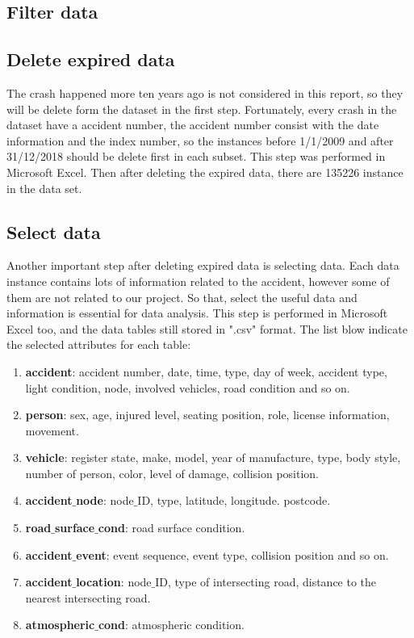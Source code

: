 \documentclass[11pt]{article}
\theoremstyle{definition}
\begin{document}
\subsection{Filter data}	
\subsection{Delete expired data}
The crash happened more ten years ago is not considered in this report, so they will be delete form the dataset in the first step. Fortunately, every crash in the dataset have a accident number, the accident number consist with the date information and the index number, so the instances before 1/1/2009 and after 31/12/2018 should be delete first in each subset.   This step was performed in Microsoft Excel. Then after deleting the expired data, there are 135226 instance in the data set.

\subsection{Select data}
Another important step after deleting expired data is selecting data. Each data instance contains lots of information related to the accident, however some of them are not related to our project. So that, select the useful data and information is essential for data analysis. This step is performed in Microsoft Excel too, and the data tables still stored in ".csv" format. The list blow indicate the selected attributes for each table:
\begin{enumerate}
	\item \textbf{accident}: accident number, date, time, type, day of week, accident type, light condition, node, involved vehicles, road condition and so on.
	\item \textbf{person}: sex, age, injured level, seating position, role, license information, movement. 
	\item \textbf{vehicle}: register state, make, model, year of manufacture, type, body style, number of person, color, level of damage, collision position. 
	\item \textbf{accident$\_$node}:	node$\_$ID, type, latitude, longitude. postcode.  
	\item \textbf{road$\_$surface$\_$cond}: road surface condition.
	\item \textbf{accident$\_$event}: event sequence, event type, collision position and so on.
	\item \textbf{accident$\_$location}:	 node$\_$ID, type of intersecting road, distance to the nearest intersecting road. 
	\item \textbf{atmospheric$\_$cond}:	atmospheric condition.
\end{enumerate}
\end{document}
